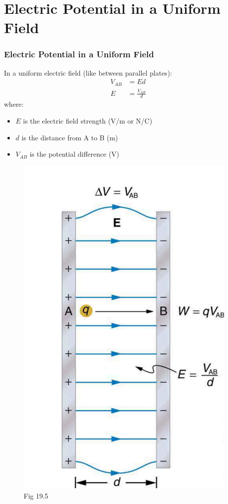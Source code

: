 \documentclass{beamer}
\begin{document}
\section{Electric Potential in a Uniform Field}

\begin{frame}
    \frametitle{Electric Potential in a Uniform Field}
    
    In a uniform electric field (like between parallel plates):
    \begin{align}
        V_{AB} &= Ed \\
        E &= \frac{V_{AB}}{d}
    \end{align}
    where:
    \begin{itemize}
        \item $E$ is the electric field strength (V/m or N/C)
        \item $d$ is the distance from A to B (m)
        \item $V_{AB}$ is the potential difference (V)
    \end{itemize}
    \end{frame}

\begin{frame}
    \begin{figure}
        \centering
        \includegraphics[width=0.4\linewidth]{phys12-electrostatics-parallel-plates-electric-field.png}
        \caption{Fig 19.5}
    \end{figure}
\end{frame}
\end{document}
